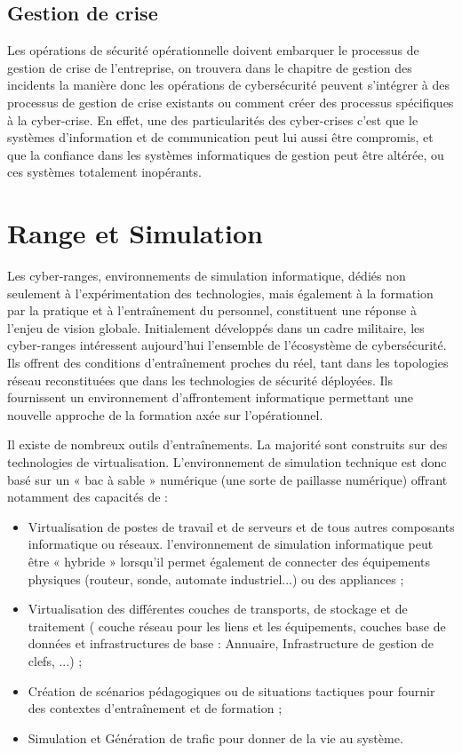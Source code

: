 \subsection{Gestion de crise}

Les opérations de sécurité opérationnelle doivent embarquer le processus de gestion de crise de l'entreprise, on trouvera dans le chapitre de gestion des incidents la manière donc les opérations de cybersécurité peuvent s'intégrer à des processus de gestion de crise existants ou comment créer des processus spécifiques à la cyber-crise. En effet, une des particularités des cyber-crises c'est que le systèmes d'information et de communication peut lui aussi être compromis, et que la confiance dans les systèmes informatiques de gestion peut être altérée, ou ces systèmes totalement inopérants.  

\section{Range et Simulation}

Les cyber-ranges, environnements de simulation informatique, dédiés non seulement à l’expérimentation des technologies, mais également à la formation par la pratique et à l’entraînement du personnel, constituent une réponse à l'enjeu de vision globale.  Initialement développés dans un cadre militaire,  les  cyber-ranges intéressent aujourd'hui l’ensemble de l’écosystème de cybersécurité. Ils offrent des conditions d’entraînement proches du réel, tant dans les topologies réseau reconstituées que dans les technologies de sécurité déployées. Ils fournissent un environnement d’affrontement informatique permettant une nouvelle approche de la formation axée sur l’opérationnel.

Il existe de nombreux outils d'entraînements. La majorité sont construits sur des technologies de virtualisation.
L’environnement de simulation technique est donc basé sur un « bac à sable » numérique (une sorte de paillasse numérique) offrant notamment des capacités de :
\begin{itemize}
  \item Virtualisation de postes de travail et de serveurs  et de tous autres composants informatique ou réseaux. l'environnement de simulation informatique peut être  « hybride » lorsqu’il permet également de connecter des équipements physiques (routeur, sonde, automate industriel...) ou des appliances ;
  \item Virtualisation des différentes couches de transports, de stockage et de traitement ( couche réseau pour les liens et les équipements, couches base de données et infrastructures de base : Annuaire, Infrastructure de gestion de clefs, ...) ; 
  \item  Création de scénarios pédagogiques ou de situations tactiques pour fournir des contextes d'entraînement et de formation ;
  \item  Simulation et Génération de trafic pour donner de la vie au système.

\end{itemize}

